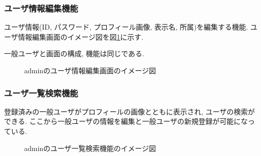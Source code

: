 \documentclass[11ptm]{jsarticle}
\begin{document}
\clearpage
\subsubsection{ユーザ情報編集機能}
\label{subsubsec:ユーザ情報編集機能}
ユーザ情報(ID, パスワード, プロフィール画像, 表示名, 所属)を編集する機能. ユーザ情報編集画面のイメージ図を図\ref{fig:adminのユーザ情報編集画面のイメージ図}に示す. \par
一般ユーザと画面の構成, 機能は同じである.
\begin{figure}[h]
  \centering
  \caption{\label{fig:adminのユーザ情報編集画面のイメージ図}adminのユーザ情報編集画面のイメージ図}
\end{figure}

\clearpage
\subsubsection{ユーザ一覧検索機能}
\label{subsubsec:ユーザ一覧検索機能}
登録済みの一般ユーザがプロフィールの画像とともに表示され, ユーザの検索ができる. ここから一般ユーザの情報を編集と一般ユーザの新規登録が可能になっている.
\begin{figure}[h]
  \centering
  \caption{\label{fig:adminのユーザ一覧検索機能のイメージ図}adminのユーザ一覧検索機能のイメージ図}
\end{figure}
\end{document}
